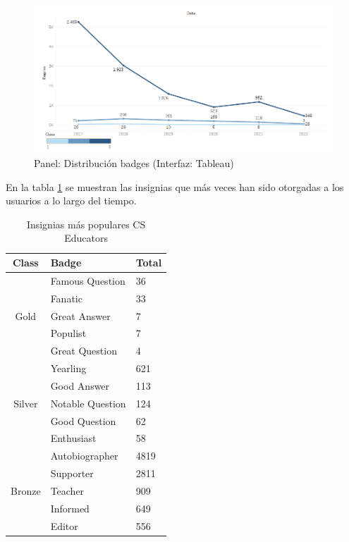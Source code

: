 \documentclass[a4paper, 12pt]{book}
\begin{document}
\begin{figure}[ht]
    \centering
    \includegraphics[width=\textwidth]{img/cse/badges.png}
    \caption{Panel: Distribución badges (Interfaz: Tableau)}
    \label{figura:badges}
\end{figure}


En la tabla \ref{tab:top_5_tags_cse} se muestran las insignias que más veces han sido otorgadas a los usuarios a lo largo del tiempo. 

\begin{table}[ht]
    \begin{center}
        \begin{tabular}{ c  l  l  }
        \hline
          \textbf{Class} & \textbf{Badge} & \textbf{Total} \\ \hline
            \multirow{5}{*}{Gold} & Famous Question & 36 \\ 
            & Fanatic & 33  \\ 
            & Great Answer & 7 \\
            & Populist & 7 \\ 
            & Great Question & 4 \\
            \hline
            \multirow{5}{*}{Silver} & Yearling & 621 \\ 
            & Good Answer & 113  \\ 
            & Notable Question & 124 \\
            & Good Question & 62 \\
            & Enthusiast & 58 \\ 
            \hline
            \multirow{5}{*}{Bronze} & Autobiographer & 4819 \\ 
            & Supporter & 2811 \\
            & Teacher & 909 \\ 
            & Informed & 649 \\ 
            & Editor & 556 \\
        \end{tabular}
        \caption{Insignias más populares CS Educators}
        \label{tab:top_5_tags_cse}
    \end{center}
\end{table}
\end{document}
